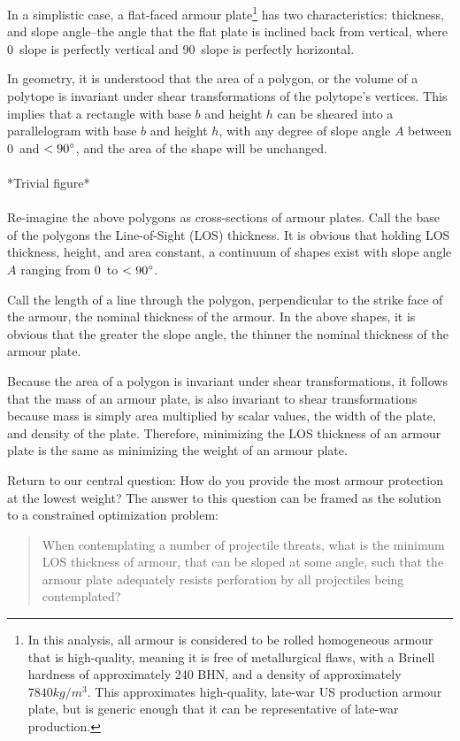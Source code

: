 \documentclass[]{article}
\begin{document}
In a simplistic case, a flat-faced armour plate\footnote{In this analysis, all armour is considered to be rolled homogeneous armour that is high-quality, meaning it is free of metallurgical flaws, with a Brinell hardness of approximately 240 BHN, and a density of approximately $7840 kg/m^3$. This approximates high-quality, late-war US production armour plate, but is generic enough that it can be representative of  late-war production.} has two characteristics: thickness, and slope angle--the angle that the flat plate is inclined back from vertical, where 0\degree\ slope is perfectly vertical and 90\degree\ slope is perfectly horizontal.

In geometry, it is understood that the area of a polygon, or the volume of a polytope is invariant under shear transformations of the polytope’s vertices. This implies that a rectangle with base $b$ and height $h$ can be sheared into a parallelogram with base $b$ and height $h$, with any degree of slope angle $A$ between 0\degree\ and $<90\degree$, and the area of the shape will be unchanged.
\\\\
*Trivial figure*
\\\\
Re-imagine the above polygons as cross-sections of armour plates. Call the base of the polygons the Line-of-Sight (LOS) thickness. It is obvious that holding LOS thickness, height, and area constant, a continuum of shapes exist with slope angle $A$ ranging from 0\degree\ to $<90\degree$.

Call the length of a line through the polygon, perpendicular to the strike face of the armour, the nominal thickness of the armour. In the above shapes, it is obvious that the greater the slope angle, the thinner the nominal thickness of the armour plate.

Because the area of a polygon is invariant under shear transformations, it follows that the mass of an armour plate, is also invariant to shear transformations because mass is simply area multiplied by scalar values, the width of the plate, and density of the plate. Therefore, minimizing the LOS thickness of an armour plate is the same as minimizing the weight of an armour plate.

Return to our central question: How do you provide the most armour protection at the lowest weight? The answer to this question can be framed as the solution to a constrained optimization problem:
\\
\begin{quote}
When contemplating a number of projectile threats, what is the minimum LOS thickness of armour, that can be sloped at some angle, such that the armour plate adequately resists perforation by all projectiles being contemplated?\\
\end{quote}
\end{document}
